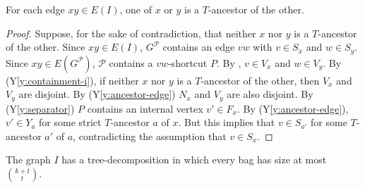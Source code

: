 \documentclass{patmorin}
\newcommand{\yref}[1]{(Y\ref{y:#1})}
\begin{document}
\begin{clm}
  For each edge $xy\in E(I)$, one of $x$ or $y$ is a $T$-ancestor of the other.
\end{clm}

\begin{proof}
  Suppose, for the sake of contradiction, that neither $x$ nor $y$ is a $T$-ancestor of the other.  Since $xy\in E(I)$, $G^\mathcal{P}$ contains an edge $vw$ with $v\in S_x$ and $w\in S_y$.  Since $xy\in E(G^{\mathcal{P}})$,  $\mathcal{P}$ contains a $vw$-shortcut $P$.  By , $v\in V_x$ and $w\in V_y$.  By \yref{containment-i}, if neither $x$ nor $y$ is a $T$-ancestor of the other, then $V_x$ and $V_y$ are disjoint.  By \yref{ancestor-edge} $N_x$ and $V_y$ are also disjoint.  By \yref{separator} $P$ contains an internal vertex $v'\in F_x$.  By \yref{ancestor-edge}, $v'\in Y_a$ for some strict $T$-ancestor $a$ of $x$.  But this implies that $v\in S_{a'}$ for some $T$-ancestor $a'$ of $a$, contradicting the assumption that $v\in S_x$.
\end{proof}

\begin{clm}
  The graph $I$ has a tree-decomposition in which every bag has size at most $\binom{k+t}{t}$.
\end{clm}
\end{document}
